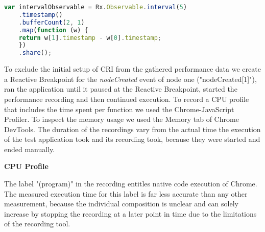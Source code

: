 	\begin{lstlisting}[language=JavaScript, caption={Example of RxJS code.},label={lst:performanceTestExtract}]
	var intervalObservable = Rx.Observable.interval(5)
	.timestamp()
	.bufferCount(2, 1)
	.map(function (w) {
	return w[1].timestamp - w[0].timestamp;
	})
	.share();	
	\end{lstlisting}

	To exclude the initial setup of CRI from the gathered performance data we create a Reactive Breakpoint for the \emph{nodeCreated} event of node one ("nodeCreated[1]"), ran the application until it paused at the Reactive Breakpoint, started the performance recording and then continued execution. To record a CPU profile that includes the time spent per function we used the Chrome-JavaScript Profiler. To inspect the memory usage we used the Memory tab of Chrome DevTools. The duration of the recordings vary from the actual time the execution of the test application took and its recording took, because they were started and ended manually. 
	
	\textbf{CPU Profile}
	
	The label "(program)" in the recording entitles native code execution of Chrome. The measured execution time for this label is far less accurate than any other measurement, because the individual composition is unclear and can solely increase by stopping the recording at a later point in time due to the limitations of the recording tool.
	
